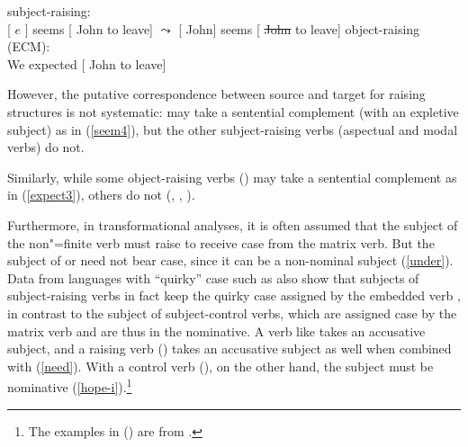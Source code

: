\eal
\ex subject-raising:\\
{}[ $e$ ] seems [ John to leave] 
$\leadsto$  
{}[ John] seems [ \st{John} to leave]
\ex object-raising (ECM):\\
We expected [ John to leave] 	
\zl

\noindent
However, the putative correspondence between source and target for raising structures is not
systematic:  may take a sentential complement (with an expletive subject) as in
(\ref{seem4}), but the other subject-raising verbs (aspectual and modal verbs) do not.

\eal
{}
\zl
 
 \noindent
 Similarly, while some object-raising verbs () may take a sentential complement as in (\ref{expect3}), others do not (, , ).
 
\eal
{}
\zl

Furthermore, in transformational analyses, it is often assumed that the subject of the non"=finite verb must raise to receive case from the matrix verb.
 But the subject of  or  need not bear case, since it can be a non-nominal subject (\ref{under}).
Data from languages with ``quirky'' case such as  also show that subjects of
subject-raising verbs in fact keep the quirky case assigned by the embedded verb
\citep{Zaenenetal1985}\addpages, in contrast to the subject of subject-control verbs, which are assigned
case by the matrix verb and are thus in the nominative. A verb like  takes an accusative
subject, and a raising verb () takes an accusative subject as well when combined with
 (\ref{need}). With a control verb (), on the other hand, the subject must be
nominative (\ref{hope-i}).\footnote{
The examples in () are from  .
}

